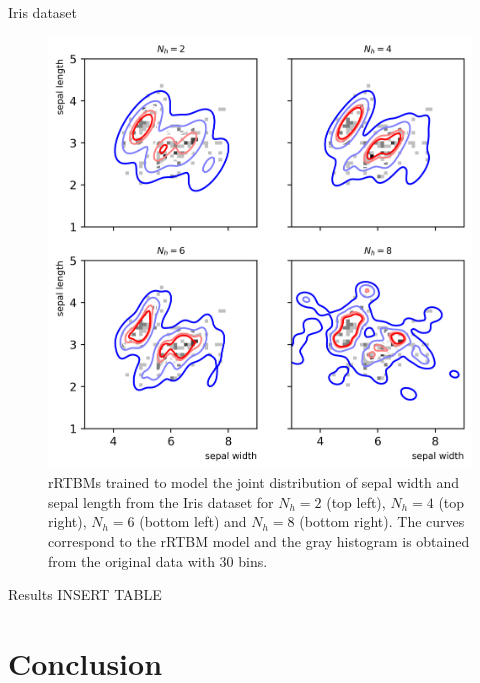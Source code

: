 \documentclass[10pt]{beamer}
\begin{document}
\begin{frame}{Iris dataset}

    \begin{figure}
        \includegraphics[scale=0.7]{figures/iris.png}
       
            \caption{rRTBMs trained to model the joint 
            distribution of sepal width and sepal length from the Iris dataset for $N_h = 2$ (top left), $N_h = 4$ (top right), $N_h = 6$ (bottom left) and $N_h = 8$ (bottom right).
                 The curves correspond to the rRTBM model and the gray histogram is obtained from the original data with 30 bins.}
    \end{figure}
    
    
\end{frame}

\begin{frame}{Results}
    INSERT TABLE
    
\end{frame}

\section{Conclusion}
\end{document}
